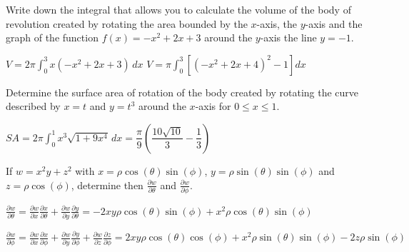 \begin{Exercise} Write down the integral that allows you to calculate the volume of the body of revolution created by rotating the area bounded by the $x$-axis, the $y$-axis and the graph of the function $f(x)=-x^2+2x+3$ around the
\Question $y$-axis  %
\Question the line $y=-1$. %
\end{Exercise}

\begin{Answer}

\Question $\displaystyle V = 2\pi\int_0^3 x(-x^2+2x+3)\, dx $
\Question $\displaystyle V = \pi\int_0^3 \left[(-x^2+2x+4)^2-1\right] dx $
    
\end{Answer}



\begin{Exercise} Determine the surface area of rotation of the body created by rotating the curve described by $x=t$ and $y=t^3$ around the $x$-axis for $0\leq x\leq1$.
\end{Exercise}

\begin{Answer}
$\displaystyle SA = 2\pi\int_0^1 x^3\sqrt{1+9x^4}\, dx = \dfrac{\pi}{9} \left(\dfrac{10\sqrt{10}}{3}-\dfrac{1}{3}\right)$    
\end{Answer}





\begin{Exercise}If $w=x^2y+z^2$ with $x=\rho\cos(\theta)\sin(\phi)$, $y=\rho\sin(\theta)\sin(\phi)$ and \linebreak $z=\rho\cos(\phi)$, determine then $\frac{\partial w}{\partial \theta}$ and $\frac{\partial w}{\partial \phi}$. 
\end{Exercise}

\begin{Answer}

\Question[] $\displaystyle\frac{\partial w}{\partial \theta} = \frac{\partial w}{\partial x}\frac{\partial x}{\partial \theta} + \frac{\partial w}{\partial y}\frac{\partial y}{\partial \theta} = -2xy\rho\cos(\theta)\sin(\phi) +x^2\rho\cos(\theta)\sin(\phi)$

\Question[] $\displaystyle\frac{\partial w}{\partial \phi} = \frac{\partial w}{\partial x}\frac{\partial x}{\partial \phi} + \frac{\partial w}{\partial y}\frac{\partial y}{\partial \phi} + \frac{\partial w}{\partial z}\frac{\partial z}{\partial \phi}  = 2xy\rho\cos(\theta)\cos(\phi) +x^2\rho\sin(\theta)\sin(\phi) -2z\rho\sin(\phi)$

    
\end{Answer}



